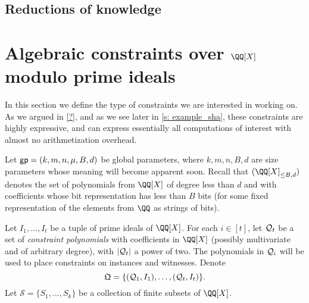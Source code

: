 \documentclass[11pt,letterpaper,usenames,dvipsnames]{article}
\begin{document}
\subsection{Reductions of knowledge}

\section{Algebraic constraints over $\QQ[X]$ modulo prime ideals}

In this section we define the type of constraints we are interested in working on. As we argued in \cref{?}, and as we see later in \cref{s: example_sha}, these constraints are highly expressive, and can  express essentially all computations of interest with almost no arithmetization overhead.

\newcommand{\evalconstraints}{\text{\emph{Eval}}}
\newcommand{\mainQpolyring}{(\QQ[X]_{\leq B, d})}
\newcommand{\mainQpolyringmultilin}{(\QQ[X]_{\leq B, d})^{\multilin}}



%

\newcommand{\megaQ}{\mathfrak{Q}}
\renewcommand{\ff}{\mathbf{f}}
\newcommand{\cS}{\mathcal{S}}
\newcommand{\gpunrolled}{(k, m, n, \mu, B, d)}

Let $\gp = \gpunrolled$ be global parameters, where $k,m,n,B,d$ are size parameters whose meaning will become apparent soon. Recall that $\mainQpolyring$ denotes the set of polynomials from $\QQ[X]$ of degree less than $d$ and with coefficients whose bit representation has less than $B$ bits (for some fixed representation of the elements from $\QQ$ as strings of bits).

Let $I_1,\ldots, I_t$ be a tuple of prime ideals of $\QQ[X]$. For each $i\in [t]$, let $\mathcal{Q}_t$ be a set  of \emph{constraint polynomials} with coefficients in $\QQ[X]$ (possibly multivariate and of arbitrary degree), with $|\mathcal{Q}_t|$ a power of two.  The polynomials in $\mathcal{Q}_i$ will be used to place constraints on instances and witnesses.
Denote 
%
$$
\megaQ = \{(\cQ_1, I_1), \ldots, (\cQ_t, I_t)\}.
$$
%
Let $\cS=\{S_1, \ldots, S_k\}$ be a collection of finite subsets of $\QQ[X]$.
%
 
\end{document}
